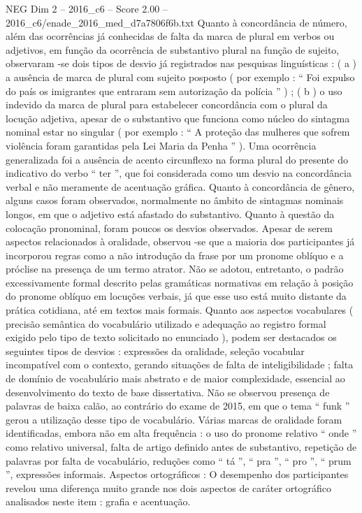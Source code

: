 \begin{textsample}{NEG Dim 2 – 2016\_c6 – Score 2.00 – 2016\_c6/enade\_2016\_med\_d7a7806f6b.txt}
Quanto à concordância de número, além das ocorrências já conhecidas de falta da marca de plural em verbos ou adjetivos, em função da ocorrência de substantivo plural na função de sujeito, observaram -se dois tipos de desvio já registrados nas pesquisas linguísticas : ( a ) a ausência de marca de plural com sujeito posposto ( por exemplo : “ Foi expulso do país os imigrantes que entraram sem autorização da polícia ” ) ; ( b ) o uso indevido da marca de plural para estabelecer concordância com o plural da locução adjetiva, apesar de o substantivo que funciona como núcleo do sintagma nominal estar no singular ( por exemplo : “ A proteção das mulheres que sofrem violência foram garantidas pela Lei Maria da Penha ” ).
Uma ocorrência generalizada foi a ausência de acento circunflexo na forma plural do presente do indicativo do verbo “ ter ”, que foi considerada como um desvio na concordância verbal e não meramente de acentuação gráfica.
Quanto à concordância de gênero, alguns casos foram observados, normalmente no âmbito de sintagmas nominais longos, em que o adjetivo está afastado do substantivo.
Quanto à questão da colocação pronominal, foram poucos os desvios observados.
Apesar de serem aspectos relacionados à oralidade, observou -se que a maioria dos participantes já incorporou regras como a não introdução da frase por um pronome oblíquo e a próclise na presença de um termo atrator.
Não se adotou, entretanto, o padrão excessivamente formal descrito pelas gramáticas normativas em relação à posição do pronome oblíquo em locuções verbais, já que esse uso está muito distante da prática cotidiana, até em textos mais formais.
Quanto aos aspectos vocabulares ( precisão semântica do vocabulário utilizado e adequação ao registro formal exigido pelo tipo de texto solicitado no enunciado ), podem ser destacados os seguintes tipos de desvios : expressões da oralidade, seleção vocabular incompatível com o contexto, gerando situações de falta de inteligibilidade ; falta de domínio de vocabulário mais abstrato e de maior complexidade, essencial ao desenvolvimento do texto de base dissertativa.
Não se observou presença de palavras de baixa calão, ao contrário do exame de 2015, em que o tema “ funk ” gerou a utilização desse tipo de vocabulário.
Várias marcas de oralidade foram identificadas, embora não em alta frequência : o uso do pronome relativo “ onde ” como relativo universal, falta de artigo definido antes de substantivo, repetição de palavras por falta de vocabulário, reduções como “ tá ”, “ pra ”, “ pro ”, “ prum ”, expressões informais.
Aspectos ortográficos : O desempenho dos participantes revelou uma diferença muito grande nos dois aspectos de caráter ortográfico analisados neste item : grafia e acentuação.

\end{textsample}
